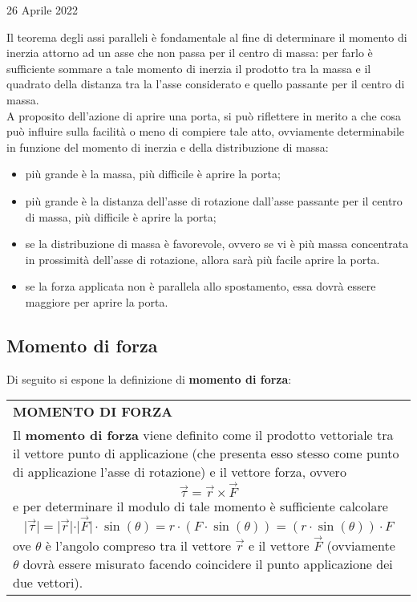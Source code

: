 \documentclass[a4paper]{extarticle}
\renewcommand\arraystretch{}
\begin{document}
\newpage
\noindent
\begin{center}
  26 Aprile 2022
\end{center}
Il teorema degli assi paralleli è fondamentale al fine di determinare il momento di inerzia attorno ad un asse che non passa per il centro di massa: per farlo è sufficiente sommare a tale momento di inerzia il prodotto tra la massa e il quadrato della distanza tra la l'asse considerato e quello passante per il centro di massa.\\
A proposito dell'azione di aprire una porta, si può riflettere in merito a che cosa può influire sulla facilità o meno di compiere tale atto, ovviamente determinabile in funzione del momento di inerzia e della distribuzione di massa:
\begin{itemize}
  \item più grande è la massa, più difficile è aprire la porta;
  \item più grande è la distanza dell'asse di rotazione dall'asse passante per il centro di massa, più difficile è aprire la porta;
  \item se la distribuzione di massa è favorevole, ovvero se vi è più massa concentrata in prossimità dell'asse di rotazione, allora sarà più facile aprire la porta.
  \item se la forza applicata non è parallela allo spostamento, essa dovrà essere maggiore per aprire la porta.
\end{itemize}

\vspace{1em}
\subsection{Momento di forza}
Di seguito si espone la definizione di \textbf{momento di forza}:

\vspace{1em}
\setlength{\tabcolsep}{14pt}
\renewcommand{\arraystretch}{2}
\noindent
\begin{tabularx}{\textwidth}{@{}|P|@{}}
    \hline
    {\textbf{MOMENTO DI FORZA}}\\
    \parbox{\linewidth}{Il \textbf{momento di forza} viene definito come il prodotto vettoriale tra il vettore punto di applicazione (che presenta esso stesso come punto di applicazione l'asse di rotazione) e il vettore forza, ovvero
    \[\boxed{\vec \tau = \vec r \times \vec F}\]
    e per determinare il modulo di tale momento è sufficiente calcolare
    \[\vert \vec \tau \vert = \vert \vec r \vert \cdot \vert \vec F \vert \cdot \sin(\theta) = r \cdot (F \cdot \sin(\theta)) = (r \cdot \sin(\theta)) \cdot F\]
    ove $\theta$ è l'angolo compreso tra il vettore $\vec r$ e il vettore $\vec F$ (ovviamente $\theta$ dovrà essere misurato facendo coincidere il punto applicazione dei due vettori).\vspace{3mm}}\\
    \hline
\end{tabularx}
\end{document}
